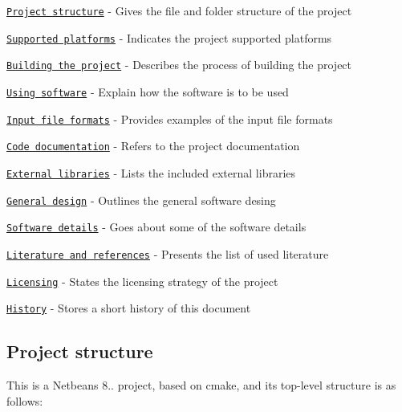 \begin{DoxyEnumerate}
\item \href{#project-structure}{\tt Project structure} -\/ Gives the file and folder structure of the project
\item \href{#supported-platforms}{\tt Supported platforms} -\/ Indicates the project supported platforms
\item \href{#building-the-project}{\tt Building the project} -\/ Describes the process of building the project
\item \href{#using-software}{\tt Using software} -\/ Explain how the software is to be used
\item \href{#input-file-formats}{\tt Input file formats} -\/ Provides examples of the input file formats
\item \href{#code-documentation}{\tt Code documentation} -\/ Refers to the project documentation
\item \href{#external-libraries}{\tt External libraries} -\/ Lists the included external libraries
\item \href{#general-design}{\tt General design} -\/ Outlines the general software desing
\item \href{#software-details}{\tt Software details} -\/ Goes about some of the software details
\item \href{#literature-and-references}{\tt Literature and references} -\/ Presents the list of used literature
\item \href{#licensing}{\tt Licensing} -\/ States the licensing strategy of the project
\item \href{#history}{\tt History} -\/ Stores a short history of this document
\end{DoxyEnumerate}

\subsection*{Project structure}

This is a Netbeans 8.. project, based on cmake, and its top-\/level structure is as follows\+:


